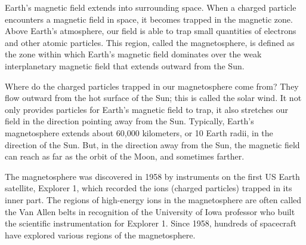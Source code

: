 \documentclass{article}
\numberwithin{equation}{section}
\numberwithin{figure}{section}
\begin{document}
Earth's magnetic field extends into surrounding space. When a charged particle encounters a magnetic field in space, it becomes trapped in the magnetic zone. Above Earth's atmosphere, our field is able to trap small quantities of electrons and other atomic particles. This region, called the \gls{magnetosphere}, is defined as the zone within which Earth's magnetic field dominates over the weak interplanetary magnetic field that extends outward from the Sun.

\vspace{1em}


\begin{center}
\end{center}

Where do the charged particles trapped in our magnetosphere come from? They flow outward from the hot surface of the Sun; this is called the solar wind. It not only provides particles for Earth's magnetic field to trap, it also stretches our field in the direction pointing away from the Sun. Typically, Earth's magnetosphere extends about 60,000 kilometers, or 10 Earth radii, in the direction of the Sun. But, in the direction away from the Sun, the magnetic field can reach as far as the orbit of the Moon, and sometimes farther.

\vspace{1em}

The magnetosphere was discovered in 1958 by instruments on the first US Earth satellite, Explorer 1, which recorded the ions (charged particles) trapped in its inner part. The regions of high-energy ions in the magnetosphere are often called the Van Allen belts in recognition of the University of Iowa professor who built the scientific instrumentation for Explorer 1. Since 1958, hundreds of spacecraft have explored various regions of the magnetosphere.
\vspace{1ex}
\cyanhrule
\vspace{-1ex}
\end{document}
